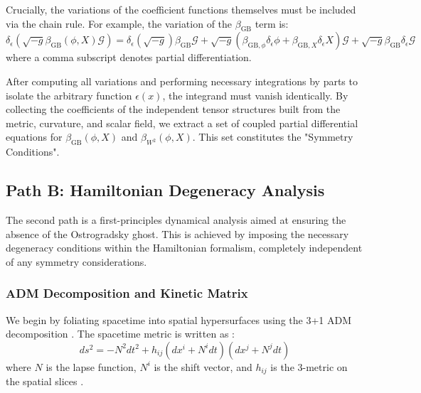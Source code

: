 \documentclass[twocolumn]{aastex631}
\begin{document}
Crucially, the variations of the coefficient functions themselves must be included via the chain rule. For example, the variation of the $\beta_{\text{GB}}$ term is:
\begin{equation}
\delta_\epsilon(\sqrt{-g}\beta_{\text{GB}}(\phi, X)\mathcal{G}) = \delta_\epsilon(\sqrt{-g})\beta_{\text{GB}}\mathcal{G} + \sqrt{-g}(\beta_{\text{GB},\phi}\delta_\epsilon\phi + \beta_{\text{GB},X}\delta_\epsilon X)\mathcal{G} + \sqrt{-g}\beta_{\text{GB}}\delta_\epsilon\mathcal{G}
\end{equation}
where a comma subscript denotes partial differentiation.

After computing all variations and performing necessary integrations by parts to isolate the arbitrary function $\epsilon(x)$, the integrand must vanish identically. By collecting the coefficients of the independent tensor structures built from the metric, curvature, and scalar field, we extract a set of coupled partial differential equations for $\beta_{\text{GB}}(\phi, X)$ and $\beta_{W^2}(\phi, X)$. This set constitutes the "Symmetry Conditions".

\subsection{Path B: Hamiltonian Degeneracy Analysis}
The second path is a first-principles dynamical analysis aimed at ensuring the absence of the Ostrogradsky ghost. This is achieved by imposing the necessary degeneracy conditions within the Hamiltonian formalism, completely independent of any symmetry considerations. \citep{motohashi2016healthydegeneratetheorieshigher,svanberg2022theorieshigherordertimederivatives}

\subsubsection{ADM Decomposition and Kinetic Matrix}
We begin by foliating spacetime into spatial hypersurfaces using the 3+1 ADM decomposition \citep{gourgoulhon200731formalismbasesnumerical,corichi2023introductionadmformalism}. The spacetime metric is written as \citep{corichi2023introductionadmformalism}:
\begin{equation}
ds^2 = -N^2 dt^2 + h_{ij}(dx^i + N^i dt)(dx^j + N^j dt)
\end{equation}
where $N$ is the lapse function, $N^i$ is the shift vector, and $h_{ij}$ is the 3-metric on the spatial slices \citep{brewin1997adm31formulationsmooth,bajardi2024primaryconstraintsgeneralteleparallel,vinckers2024numericalsolutionsfrkleingordon}.
\end{document}
